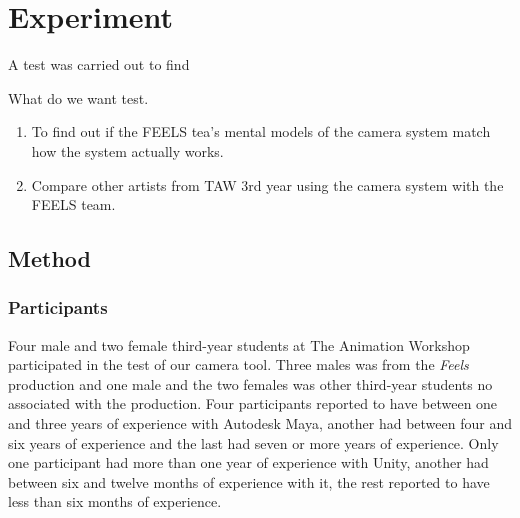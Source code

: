 \section{Experiment}


A test was carried out to find 

What do we want test.

\begin{enumerate}
\item To find out if the FEELS tea's mental models of the camera system match how the system actually works.
\item Compare other artists from TAW 3rd year using the camera system with the FEELS team.
\end{enumerate}






\subsection{Method} \label{method}

\subsubsection{Participants}
Four male and two female third-year students at The Animation Workshop participated in the test of our camera tool. Three males was from the \textit{Feels} production and one male and the two females was other third-year students no associated with the production. Four participants reported to have between one and three years of experience with Autodesk Maya, another had between four and six years of experience and the last had seven or more years of experience. Only one participant had more than one year of experience with Unity, another had between six and twelve months of experience with it, the rest reported to have less than six months of experience.

